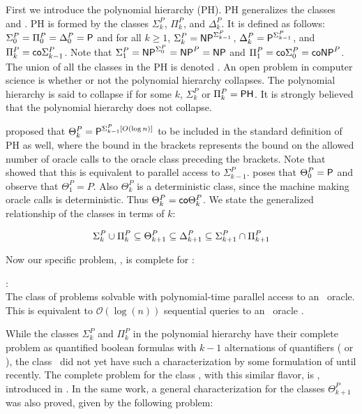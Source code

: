 First we introduce the polynomial hierarchy (PH).
PH generalizes the classes \np~ and .
PH is formed by the classes $\Sigma_k^P$, $\Pi_k^P$, and $\Delta_k^P$.
It is defined as follows: $\Sigma_0^P = \Pi_0^P = \Delta_0^P = \mathsf{P}$ and
for all $k \geq 1$,
$\Sigma_k^P = \mathsf{NP}^{\Sigma_{k-1}^P}$,
$\Delta_k^P = \mathsf{P}^{\Sigma_{k-1}^P}$, and
$\Pi_k^P = \mathsf{co}\Sigma_{k-1}^P$.
Note that
$\Sigma_1^P = \mathsf{NP}^{\Sigma_{0}^P} = \mathsf{NP}^{P} = \mathsf{NP}$
and $\Pi_1^P = \mathsf{co}{\Sigma_{0}^P} = \mathsf{coNP}^{P}$.
The union of all the classes in the PH is denoted .
An open problem in computer science is whether or not
the polynomial hierarchy collapses.
The polynomial hierarchy is said to collapse if for some $k$, $\Sigma_k^P$ or $\Pi_k^P = \mathsf{PH}$.
It is strongly believed that the
polynomial hierarchy does not collapse.

\citet{PZ83} proposed that $\Theta_{k}^P = \mathsf{P}^{\Sigma_{k-1}^P
[O(\log n)]}$ to be included in the standard definition of PH as well,
where the bound in the brackets represents the bound on the allowed
number of oracle calls to the oracle class preceding the brackets.
Note that \citet{hem87} showed that this is equivalent to parallel
access to $\Sigma_{k-1}^P$.
\citet{compsat} poses that $\Theta_0^P = \mathsf{P}$ and observe that
$\Theta_1^P = P$.
Also $\Theta_{k}^P$ is a deterministic class, since the
machine making oracle calls is deterministic.
Thus $\Theta_{k}^P = \mathsf{co}\Theta_{k}^P$.
We state the generalized relationship of the classes in terms of
$k$:

$$\Sigma^{P}_{k} \cup \Pi^{P}_{k} \subseteq
    \Theta_{k+1}^P \subseteq \Delta^{P}_{k+1}
    \subseteq \Sigma^{P}_{k+1} \cap \Pi^{P}_{k+1}$$

Now our specific problem, \dwin, is complete for \tp:

\begin{defn}{\tp:} \\
    The class of problems solvable with polynomial-time parallel access to an
    \np~oracle.
    This is equivalent to $\mathcal{O}(\log(n))$ sequential queries to an
\np~oracle \citep{hem87, ksw87}.
\end{defn}

While the classes $\Sigma^P_k$ and $\Pi^P_k$ in the polynomial hierarchy
have their complete problem as quantified boolean formulas with $k-1$
alternations of quantifiers ( or ),
the class \tp~did not yet have such a characterization by some formulation
of  until recently.
The complete problem for the class \tp, with this similar flavor, is
\csat, introduced in \citet{csatintro}.
In the same work, a general characterization for the classes
$\Theta_{k+1}^P$ was also proved, given by the following problem:


